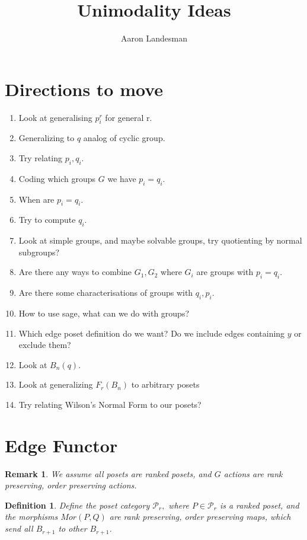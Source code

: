 \documentclass{amsart}
\title{Unimodality Ideas}
\author{Aaron Landesman}
\newtheorem{defn}[subsubsection]{Definition}
\newtheorem{rem}[subsubsection]{Remark}
\begin{document}
\maketitle
\section{Directions to move}
\begin{enumerate}
	\item Look at generalising $p_i^r$ for general r.
	\item Generalizing to $q$ analog of cyclic group.
	\item Try relating $p_i,q_i.$
	\item Coding which groups $G$ we have $p_i=q_i.$
	\item When are $p_i = q_i.$
	\item Try to compute $q_i.$
	\item Look at simple groups, and maybe solvable groups, try quotienting by normal subgroups?
	\item Are there any ways to combine $G_1,G_2$ where $G_i$ are groups with $p_i = q_i.$
	\item Are there some characterisations of groups with $q_i,p_i.$
	\item How to use sage, what can we do with groups?
	\item Which edge poset definition do we want? Do we include edges containing $y$ or exclude them?
	\item Look at $B_n(q).$ 
	\item Look at generalizing $F_r(B_n)$ to arbitrary posets
	\item Try relating Wilson's Normal Form to our posets?
\end{enumerate}

\section{Edge Functor}
\begin{rem}
We assume all posets are ranked posets, and $G$ actions are rank preserving, order preserving actions.
\end{rem}

\begin{defn}
Define the poset category $\mathcal P_r,$ where $P \in \mathcal P_r$ is a ranked poset, and the morphisms $Mor(P,Q)$ are rank preserving, order preserving maps, which send all $B_{r+1}$ to other $B_{r+1}$.
\end{defn}
\end{document}
